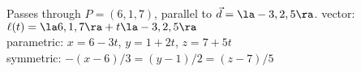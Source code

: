 {Passes through $P=(6,1,7)$, parallel to $\vec d=\la -3,2,5\ra$.
}
{vector: $\ell(t) = \la 6,1,7\ra + t\la -3,2,5\ra$\\
parametric: $x= 6-3t$, $y=1+2t$, $z = 7+5t$\\
symmetric: $-(x-6)/3 =(y-1)/2 = (z-7)/5$
}

